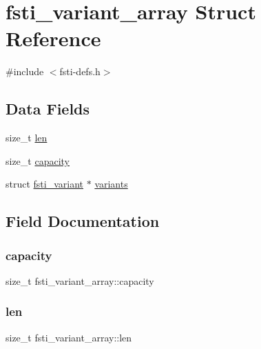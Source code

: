 \hypertarget{structfsti__variant__array}{}\section{fsti\+\_\+variant\+\_\+array Struct Reference}
\label{structfsti__variant__array}


{\ttfamily \#include $<$fsti-\/defs.\+h$>$}

\subsection*{Data Fields}
\begin{DoxyCompactItemize}
\item 
size\+\_\+t \mbox{\hyperlink{structfsti__variant__array_a39cfdcdfbafab25eecf67428eb070030}{len}}
\item 
size\+\_\+t \mbox{\hyperlink{structfsti__variant__array_a73ea0e7e2dd113ab36f38f1dfeac1cc1}{capacity}}
\item 
struct \mbox{\hyperlink{structfsti__variant}{fsti\+\_\+variant}} $\ast$ \mbox{\hyperlink{structfsti__variant__array_a1dfd401c440b5b040c3ff373c3f04930}{variants}}
\end{DoxyCompactItemize}


\subsection{Field Documentation}
\mbox{\label{structfsti__variant__array_a73ea0e7e2dd113ab36f38f1dfeac1cc1}} 
\subsubsection{\texorpdfstring{capacity}{capacity}}
{\footnotesize\ttfamily size\+\_\+t fsti\+\_\+variant\+\_\+array\+::capacity}

\mbox{\label{structfsti__variant__array_a39cfdcdfbafab25eecf67428eb070030}} 
\subsubsection{\texorpdfstring{len}{len}}
{\footnotesize\ttfamily size\+\_\+t fsti\+\_\+variant\+\_\+array\+::len}

